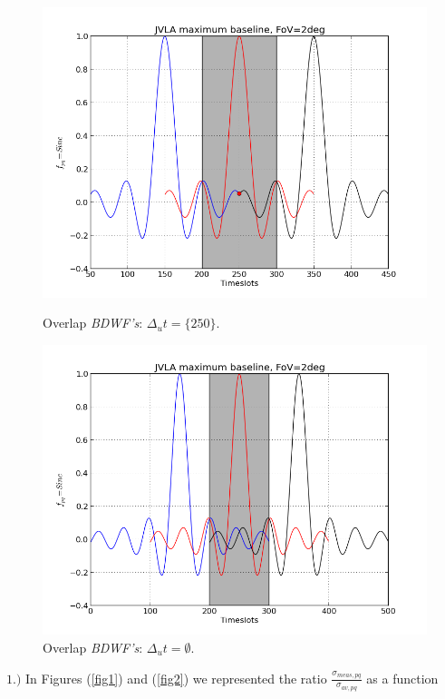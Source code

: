 \documentclass[useAMS,usenatbib]{mn2e}
\begin{document}
\begin{figure}
\begin{minipage}{0.38\linewidth}\includegraphics[width=1\textwidth]{./Figures/corrSigVLAMxBl.png}\caption{Overlap 
		\textit{BDWF's}: $\Delta_u t=\{250\}$.}\label{fig:fig_4}\end{minipage}
\begin{minipage}{0.38\linewidth}\includegraphics[width=1\textwidth]{./Figures/corrSigVLAMxBl_overlapGdelta.png}\caption{Overlap 
		\textit{BDWF's}: $\Delta_u t=\emptyset$.}\label{fig:fig_5}\end{minipage}
\end{figure}
$1.)$ In Figures (\ref{fig1}) and (\ref{fig2}) we represented the ratio $\frac{\sigma_{meas,pq}}{\sigma_{av,pq}}$ as a function 
\end{document}
